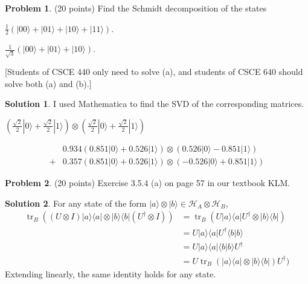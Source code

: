 \documentclass{article}
\theoremstyle{definition}
\newtheorem{problem}{Problem}
\newtheorem*{solution}{Solution}
\newcommand{\ket}[1]{|#1\rangle}
\newcommand{\bra}[1]{\langle#1|}
\DeclareMathOperator{\tr}{tr}
\begin{document}
\begin{problem}{(20 points)}
Find the Schmidt decomposition of the states 
\begin{compactenum}[(a)]
\item $ \frac{1}{2}\left( \ket{00} + \ket{01} + \ket{10} + \ket{11}
  \right)$.
\item $ \frac{1}{\sqrt{3}}\left( \ket{00} + \ket{01} + \ket{10}
  \right)$.
\end{compactenum}
[Students of CSCE 440 only need to solve (a), and students of CSCE 640
should solve both (a) and (b).] 
\end{problem}
\begin{solution}
I used Mathematica to find the SVD of the corresponding matrices.
\begin{compactenum}[(a)]
\item 
$(\frac{\sqrt{2}}{2} \ket{0} + \frac{\sqrt{2}}{2} \ket{1}) \otimes (\frac{\sqrt{2}}{2} \ket{0} + \frac{\sqrt{2}}{2} \ket{1})$
\item 
\begin{align*}
& 0.934(0.851 \ket{0} + 0.526 \ket{1}) \otimes (0.526 \ket{0} -0.851 \ket{1})
\\ + &  0.357(0.851 \ket{0} + 0.526 \ket{1}) \otimes (-0.526 \ket{0} + 0.851 \ket{1})
\end{align*}
\end{compactenum}
\end{solution}

\begin{problem}{(20 points)}
Exercise 3.5.4 (a) on page 57 in our textbook KLM. 
\end{problem}
\begin{solution}
For any state of the form $\ket{a} \otimes \ket{b} \in \mathcal{H}_A \otimes \mathcal{H}_B$,
\begin{align*}
\tr_B((U \otimes I) \ket{a} \bra{a} \otimes \ket{b} \bra{b} (U^\dagger \otimes I)) 
& = \tr_B(U \ket{a} \bra{a} U^\dagger \otimes \ket{b} \bra{b}) 
\\  & = U \ket{a} \bra{a} U^\dagger \langle b | b \rangle 
\\  & = U \ket{a} \bra{a} \langle b | b \rangle  U^\dagger
\\  & = U \tr_B(\ket{a} \bra{a} \otimes \ket{b} \bra{b})   U^\dagger)  
\end{align*}
Extending linearly, the same identity holds for any state.
\end{solution}
\end{document}
